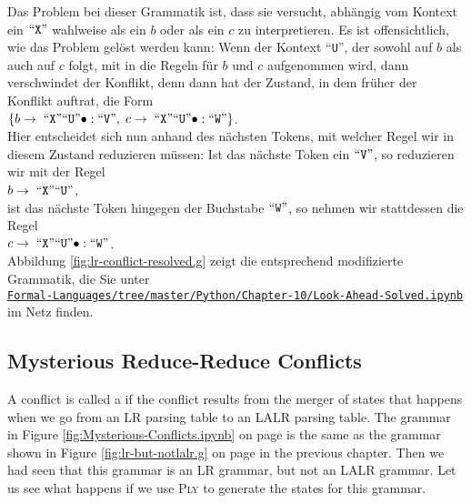 Das Problem bei dieser Grammatik ist, dass sie versucht, abh\"angig vom Kontext ein $\mbox{``\texttt{X}''}$ wahlweise
als ein $b$ oder als ein $c$ zu interpretieren.  Es ist offensichtlich, wie das Problem gel\"ost werden
kann:  Wenn der Kontext ``\texttt{U}'', der sowohl auf $b$ als auch auf $c$ folgt, mit in
die Regeln f\"ur $b$ und $c$ aufgenommen wird, dann verschwindet der Konflikt, denn dann hat der
Zustand, in dem fr\"uher der Konflikt auftrat, die Form
\\[0.2cm]
\hspace*{1.3cm}
$\{ b \rightarrow \;\mbox{``\texttt{X}''} \mbox{``\texttt{U}''}\bullet: \mbox{``\texttt{V}''},\; 
    c \rightarrow \;\mbox{``\texttt{X}''} \mbox{``\texttt{U}''}\bullet: \mbox{``\texttt{W}''} 
\}
$.
\\[0.2cm]  
Hier entscheidet sich nun anhand des n\"achsten Tokens, mit welcher Regel wir in diesem Zustand
reduzieren m\"ussen:  Ist das n\"achste Token ein $\mbox{``\texttt{V}''}$, so reduzieren wir mit der Regel
\\[0.2cm]
\hspace*{1.3cm}
$b \rightarrow \;\mbox{``\texttt{X}''} \mbox{``\texttt{U}''}$,
\\[0.2cm]
ist das n\"achste Token hingegen der Buchstabe $\mbox{``\texttt{W}''}$, so nehmen wir stattdessen die Regel
\\[0.2cm]
\hspace*{1.3cm}
$c \rightarrow \;\mbox{``\texttt{X}''} \mbox{``\texttt{U}''}\bullet: \mbox{``\texttt{W}''}$.
\\[0.2cm]
Abbildung
\ref{fig:lr-conflict-resolved.g} zeigt die entsprechend modifizierte Grammatik, die Sie unter
\\[0.2cm]
\hspace*{1.3cm}
\href{https://github.com/karlstroetmann/Formal-Languages/tree/master/Python/Chapter-10/Look-Ahead-Solved.ipynb}{\texttt{Formal-Languages/tree/master/Python/Chapter-10/Look-Ahead-Solved.ipynb}}
\\[0.2cm]
im Netz finden.


\subsection{Mysterious Reduce-Reduce Conflicts}
A conflict is called a   if the conflict results from the merger of
states that happens when we go from an LR parsing table to an LALR parsing table.  The grammar in Figure
\ref{fig:Mysterious-Conflicts.ipynb} on page \pageref{fig:Mysterious-Conflicts.ipynb} is the same as the
grammar shown in Figure \ref{fig:lr-but-notlalr.g} on page \pageref{fig:lr-but-notlalr.g} in the previous
chapter.  Then we had seen that this grammar is an LR grammar, but not an LALR grammar.  Let us see what happens
if we use \textsc{Ply} to generate the states for this grammar.

